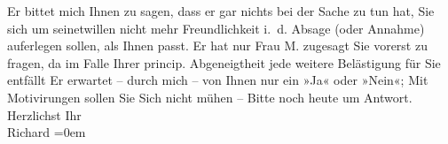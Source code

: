 \begin{ledgroupsized}[t]{13cm}
               Er bittet mich Ihnen zu sagen, dass er gar nichts bei der Sache zu tun hat, Sie sich
               um seinetwillen nicht mehr {\pb}Freundlichkeit i. d. Absage (oder Annahme) auferlegen sollen, als  Ihnen passt. Er hat nur Frau M. zugesagt Sie vorerst zu fragen, da im Falle Ihrer princip.
               Abgeneigtheit jede weitere Belästigung für Sie entfällt\pend
           \pstart
           Er erwartet – durch mich – von Ihnen nur ein »Ja« oder »Nein«; \introOben{}Mit\introOben{} Motivirungen sollen Sie Sich nicht mühen –\pend
           \pstart
           Bitte noch heute um Antwort.
               Herzlichst\pend
           \pstart
           Ihr{\\[\baselineskip]}\spacefill\mbox{Richard}\pend
           \leftskip=0em{}\endnumbering{}\end{ledgroupsized}  \newcommand{\dateiname}{L01976}\newcommand{\titel}{Richard Beer-Hofmann an Arthur Schnitzler, 3. 11. 1910}\newcommand{\editorInnen}{Martin Anton Müller und Gerd-Hermann Susen}
      